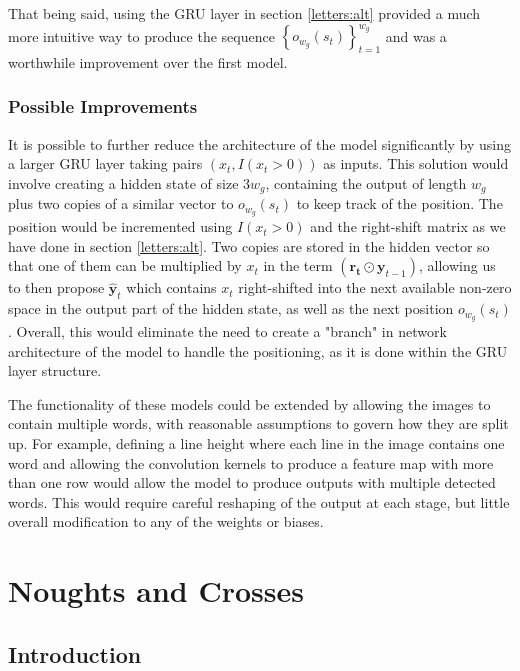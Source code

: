 \documentclass{somasmsc}
\begin{document}
That being said, using the GRU layer in section \ref{letters:alt} provided a much more intuitive way to produce the sequence $\left\{o_{w_g}(s_t)\right\}_{t=1}^{w_g}$ and was a worthwhile improvement over the first model.

\subsection{Possible Improvements}

It is possible to further reduce the architecture of the model significantly by using a larger GRU layer taking pairs $\left(x_t, I(x_t > 0)\right)$ as inputs. This solution would involve creating a hidden state of size $3w_g$, containing the output of length $w_g$ plus two copies of a similar vector to $o_{w_g}(s_t)$ to keep track of the position. The position would be incremented using $I(x_t > 0)$ and the right-shift matrix as we have done in section \ref{letters:alt}. Two copies are stored in the hidden vector so that one of them can be multiplied by $x_t$ in the term $\left(\pmb{r_t} \odot \pmb{y}_{t-1}\right)$, allowing us to then propose $\hat{\pmb{y}}_{t}$ which contains $x_t$ right-shifted into the next available non-zero space in the output part of the hidden state, as well as the next position $o_{w_g}(s_t)$. Overall, this would eliminate the need to create a "branch" in network architecture of the model to handle the positioning, as it is done within the GRU layer structure.

The functionality of these models could be extended by allowing the images to contain multiple words, with reasonable assumptions to govern how they are split up. For example, defining a line height where each line in the image contains one word and allowing the convolution kernels to produce a feature map with more than one row would allow the model to produce outputs with multiple detected words. This would require careful reshaping of the output at each stage, but little overall modification to any of the weights or biases.


\chapter{Noughts and Crosses}

\section{Introduction}
\end{document}
